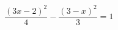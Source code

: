\begin{ex}[type=equation]
	\begin{condition}
		$\dfrac{(3x - 2)^2}{4} - \dfrac{(3-x)^2}{3} = 1$
	\end{condition}
\end{ex}